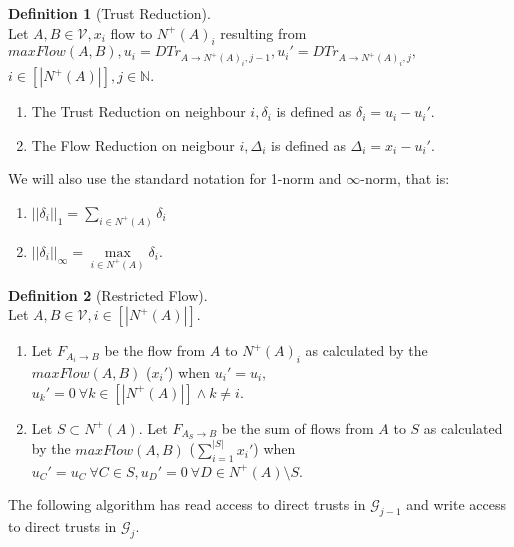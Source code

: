 \documentclass[11pt]{article}
\theoremstyle{definition}
\newtheorem{definition}{Definition}[section]
\theoremstyle{corollary}
\theoremstyle{lemma}
\begin{document}
      \begin{definition}[Trust Reduction] \ \\
         Let $A, B \in \mathcal{V}, x_i$ flow to $N^{+}(A)_i$ resulting from $maxFlow(A,B), u_i =
         DTr_{A \rightarrow N^{+}(A)_i,j-1}, u_i' = DTr_{A \rightarrow N^{+}(A)_i,j},$ \\ $i \in [|N^{+}(A)|],
         j \in \mathbb{N}$.
         \begin{enumerate}
            \item The Trust Reduction on neighbour $i, \delta_i$ is defined as $\delta_i = u_i - u_i'$.
            \item The Flow Reduction on neigbour $i, \Delta_i$ is defined as $\Delta_i = x_i - u_i'$.
         \end{enumerate}
         We will also use the standard notation for 1-norm and $\infty$-norm, that is:
         \begin{enumerate}
            \item $||\delta_i||_1 = \sum\limits_{i \in N^{+}(A)}\delta_i$
            \item $||\delta_i||_\infty = \max\limits_{i \in N^{+}(A)}\delta_i$.
         \end{enumerate}
      \end{definition}
      \begin{definition}[Restricted Flow] \ \\
         Let $A, B \in \mathcal{V}, i \in [|N^{+}(A)|]$.
         \begin{enumerate}
            \item Let $F_{A_i \rightarrow B}$ be the flow from $A$ to $N^{+}(A)_i$ as calculated by the $maxFlow(A,B)$
               ($x_i'$) when $u_i' = u_i,$ \\ $u_k' = 0 \:\forall k \in [|N^{+}(A)|] \wedge k \neq i$.
            \item Let $S \subset N^{+}(A)$. Let $F_{A_S \rightarrow B}$ be the sum of flows from $A$ to $S$ as
               calculated by the $maxFlow(A,B)$ ($\sum\limits_{i=1}^{|S|}x_i'$) when $u_C' = u_C \: \forall C \in S,
               u_D' = 0 \: \forall D \in N^{+}(A) \setminus S$.
         \end{enumerate}
      \end{definition}
  The following algorithm has read access to direct trusts in $\mathcal{G}_{j-1}$ and write access to direct trusts in
  $\mathcal{G}_j$.
\end{document}
